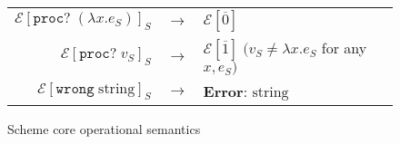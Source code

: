 \begin{figure}
\begin{center}
\begin{tabular}{rcl}
$\mathscr{E}[\mathtt{proc?}\;(\lambda x.e_{S})]_{S}$ & $\rightarrow$ & $\mathscr{E}[\overline{0}]$ \\
$\mathscr{E}[\mathtt{proc?}\;v_{S}]_{S}$ & $\rightarrow$ & $\mathscr{E}[\overline{1}]\;(v_{S}\neq\lambda x.e_{S}$ for any $x,e_{S})$ \\
$\mathscr{E}[\mathtt{wrong}\;\mathrm{string}]_{S}$ & $\rightarrow$ & \textbf{Error}: $\mathrm{string}$
\end{tabular}
\end{center}
\caption{Scheme core operational semantics}
\label{fig:scos}
\end{figure}